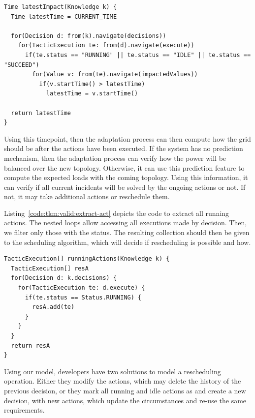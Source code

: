 \begin{lstlisting}[style=customc, caption=Get latest timepoint at which the impact will be measured, label=code:tkm:valid:latest-impact,basicstyle=\scriptsize]
Time latestImpact(Knowledge k) {
  Time latestTime = CURRENT_TIME
  
  for(Decision d: from(k).navigate(decisions))
    for(TacticExecution te: from(d).navigate(execute))
      if(te.status == "RUNNING" || te.status == "IDLE" || te.status == "SUCCEED")
        for(Value v: from(te).navigate(impactedValues))
          if(v.startTime() > latestTime)
            latestTime = v.startTime()
            
  return latestTime
}	
\end{lstlisting}

Using this timepoint, then the adaptation process can then compute how the grid should be after the actions have been executed.
If the system has no prediction mechanism, then the adaptation process can verify how the power will be balanced over the new topology.
Otherwise, it can use this prediction feature to compute the expected loads with the coming topology.
Using this information, it can verify if all current incidents will be solved by the ongoing actions or not.
If not, it may take additional actions or reschedule them.

Listing~\ref{code:tkm:valid:extract-act} depicts the code to extract all running actions.
The nested loops allow accessing all executions made by decision.
Then, we filter only those with the  status.
The resulting collection should then be given to the scheduling algorithm, which will decide if rescheduling is possible and how. 

\begin{lstlisting}[style=customc, caption=Extract ongoing actions and their effects, label=code:tkm:valid:extract-act,basicstyle=\scriptsize]
TacticExecution[] runningActions(Knowledge k) {
  TacticExecution[] resA
  for(Decision d: k.decisions) {
    for(TacticExecution te: d.execute) {
      if(te.status == Status.RUNNING) {
        resA.add(te)
      }
    }
  }
  return resA
}
\end{lstlisting}

Using our model, developers have two solutions to model a rescheduling operation.
Either they modify the actions, which may delete the history of the previous decision, or they mark all running and idle actions as  and create a new decision, with new actions, which update the circumstances and re-use the same requirements.

